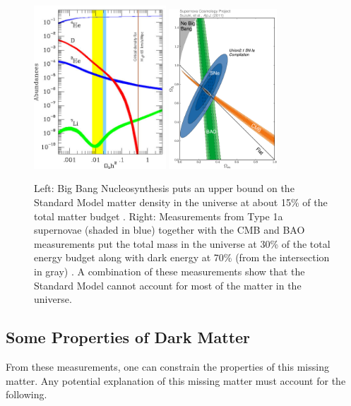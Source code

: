 \begin{figure}
    \centering
    \includegraphics[width=0.44\textwidth]{figs/motivation/bbn.jpg}
    \includegraphics[width=0.36\textwidth]{figs/motivation/scp.png}
    \caption{Left: Big Bang Nucleosynthesis puts an upper bound on the Standard Model matter density in the universe at about 15\% of the total matter budget \cite{1998RvMP...70..303S}. Right: Measurements from Type 1a supernovae (shaded in blue) together with the CMB and BAO measurements put the total mass in the universe at 30\% of the total energy budget along with dark energy at 70\% (from the intersection in gray) \cite{Amanullah_2010}. A combination of these measurements show that the Standard Model cannot account for most of the matter in the universe.}
    \label{fig:bbn}
\end{figure}

\subsection{Some Properties of Dark Matter}\label{sec:properties}

From these measurements, one can constrain the properties of this missing matter. Any potential explanation of this missing matter must account for the following. 

